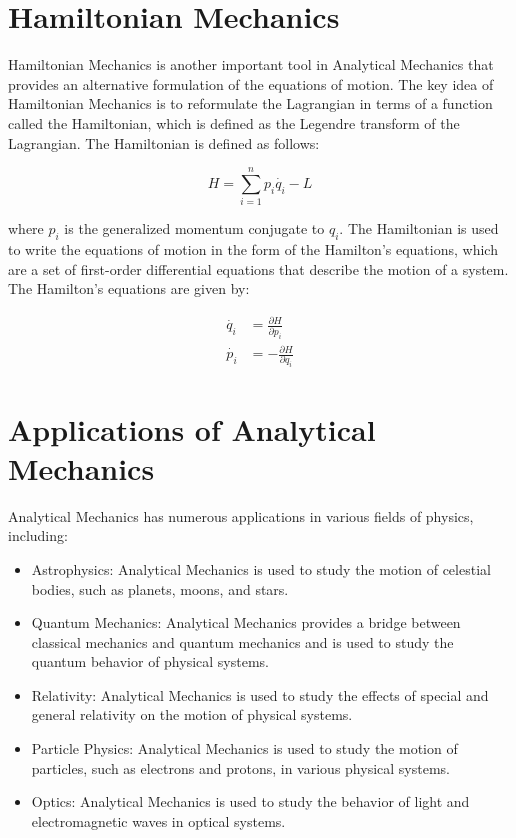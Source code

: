 \documentclass{breport}
\begin{document}
\section{Hamiltonian Mechanics}
Hamiltonian Mechanics is another important tool in Analytical Mechanics that provides an alternative formulation of the equations of motion. The key idea of Hamiltonian Mechanics is to reformulate the Lagrangian in terms of a function called the Hamiltonian, which is defined as the Legendre transform of the Lagrangian. The Hamiltonian is defined as follows:

\begin{equation}
H = \sum_{i=1}^{n}p_i\dot{q_i} - L
\end{equation}

where $p_i$ is the generalized momentum conjugate to $q_i$. The Hamiltonian is used to write the equations of motion in the form of the Hamilton's equations, which are a set of first-order differential equations that describe the motion of a system. The Hamilton's equations are given by:

\begin{align}
\dot{q_i} &= \frac{\partial H}{\partial p_i} \\
\dot{p_i} &= -\frac{\partial H}{\partial q_i}
\end{align}

\section{Applications of Analytical Mechanics}
Analytical Mechanics has numerous applications in various fields of physics, including:

\begin{itemize}
\item Astrophysics: Analytical Mechanics is used to study the motion of celestial bodies, such as planets, moons, and stars.

\item Quantum Mechanics: Analytical Mechanics provides a bridge between classical mechanics and quantum mechanics and is used to study the quantum behavior of physical systems.

\item Relativity: Analytical Mechanics is used to study the effects of special and general relativity on the motion of physical systems.

\item Particle Physics: Analytical Mechanics is used to study the motion of particles, such as electrons and protons, in various physical systems.

\item Optics: Analytical Mechanics is used to study the behavior of light and electromagnetic waves in optical systems.

\end{itemize}
\end{document}
